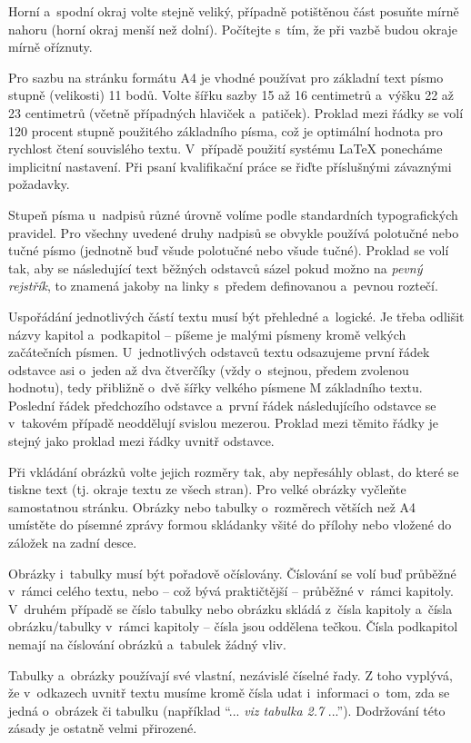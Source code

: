 Horní a~spodní okraj volte stejně veliký, případně potištěnou část posuňte mírně nahoru (horní okraj menší než dolní). Počítejte s~tím, že při vazbě budou okraje mírně oříznuty.

Pro sazbu na stránku formátu A4 je vhodné používat pro základní text písmo stupně (velikosti) 11 bodů. Volte šířku sazby 15 až 16 centimetrů a~výšku 22 až 23 centimetrů (včetně případných hlaviček a~patiček). Proklad mezi řádky se volí 120 procent stupně použitého základního písma, což je optimální hodnota pro rychlost čtení souvislého textu. V~případě použití systému LaTeX ponecháme implicitní nastavení. Při psaní kvalifikační práce se řiďte příslušnými závaznými požadavky.

Stupeň písma u~nadpisů různé úrovně volíme podle standardních typografických pravidel. 
Pro všechny uvedené druhy nadpisů se obvykle používá polotučné nebo tučné písmo (jednotně buď všude polotučné nebo všude tučné). Proklad se volí tak, aby se následující text běžných odstavců sázel pokud možno na {\it pevný rejstřík}, to znamená jakoby na linky s~předem definovanou a~pevnou roztečí.

Uspořádání jednotlivých částí textu musí být přehledné a~logické. Je třeba odlišit názvy kapitol a~podkapitol -- píšeme je malými písmeny kromě velkých začátečních písmen. U~jednotlivých odstavců textu odsazujeme první řádek odstavce asi o~jeden až dva čtverčíky (vždy o~stejnou, předem zvolenou hodnotu), tedy přibližně o~dvě šířky velkého písmene M základního textu. Poslední řádek předchozího odstavce a~první řádek následujícího odstavce se v~takovém případě neoddělují svislou mezerou. Proklad mezi těmito řádky je stejný jako proklad mezi řádky uvnitř odstavce.

Při vkládání obrázků volte jejich rozměry tak, aby nepřesáhly oblast, do které se tiskne text (tj. okraje textu ze všech stran). Pro velké obrázky vyčleňte samostatnou stránku. Obrázky nebo tabulky o~rozměrech větších než A4 umístěte do písemné zprávy formou skládanky všité do přílohy nebo vložené do záložek na zadní desce.

Obrázky i~tabulky musí být pořadově očíslovány. Číslování se volí buď průběžné v~rámci celého textu, nebo -- což bývá praktičtější -- průběžné v~rámci kapitoly. V~druhém případě se číslo tabulky nebo obrázku skládá z~čísla kapitoly a~čísla obrázku/tabulky v~rámci kapitoly -- čísla jsou oddělena tečkou. Čísla podkapitol nemají na číslování obrázků a~tabulek žádný vliv.

Tabulky a~obrázky používají své vlastní, nezávislé číselné řady. Z toho vyplývá, že v~odkazech uvnitř textu musíme kromě čísla udat i~informaci o~tom, zda se jedná o~obrázek či tabulku (například ``... {\it viz tabulka 2.7} ...''). Dodržování této zásady je ostatně velmi přirozené.

